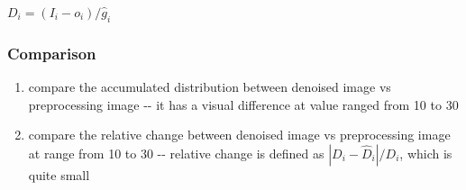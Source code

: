 \documentclass[11pt]{article}
\begin{document}
\(D_i = (I_i - o_i)/\hat{g}_i\)

\subsubsection{Comparison}\label{comparison}

\begin{enumerate}
\def\labelenumi{\arabic{enumi}.}
\item
  compare the accumulated distribution between denoised image vs
  preprocessing image -\/- it has a visual difference at value ranged
  from 10 to 30
\item
  compare the relative change between denoised image vs preprocessing
  image at range from 10 to 30 -\/- relative change is defined as
  \(|D_i - \hat{D}_i|/D_i\), which is quite small
\end{enumerate}
\end{document}
